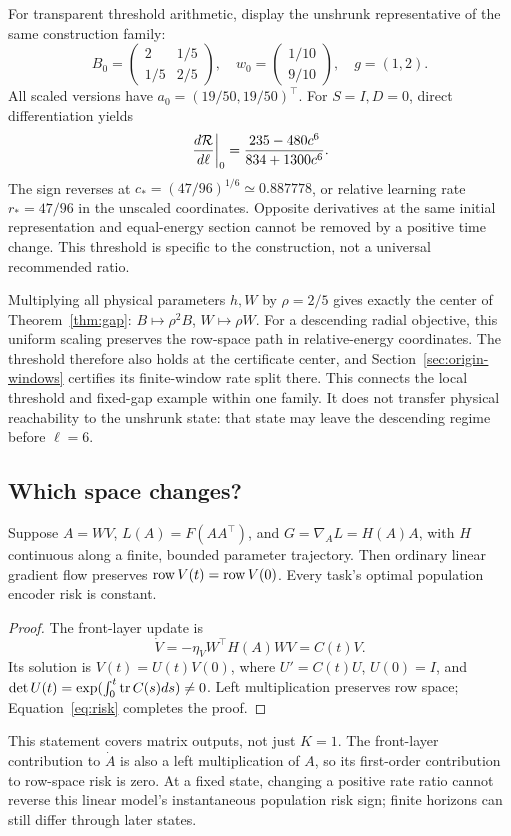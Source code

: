 For transparent threshold arithmetic, display the unshrunk representative of the same construction family:
\begin{equation}
B_0=\begin{pmatrix}2&1/5\\1/5&2/5\end{pmatrix},\quad
w_0=\begin{pmatrix}1/10\\9/10\end{pmatrix},\quad g=(1,2).
\end{equation}
All scaled versions have $a_0=(19/50,19/50)^\top$. For $S=I,D=0$, direct differentiation yields
\begin{equation}
\left.\frac{d\mathcal R}{d\ell}\right|_0
=\frac{235-480c^6}{834+1300c^6}.
\label{eq:threshold}
\end{equation}
The sign reverses at $c_*=(47/96)^{1/6}\simeq0.887778$, or relative learning rate $r_*=47/96$ in the unscaled coordinates. Opposite derivatives at the same initial representation and equal-energy section cannot be removed by a positive time change. This threshold is specific to the construction, not a universal recommended ratio.

Multiplying all physical parameters $h,W$ by $\rho=2/5$ gives exactly the center of Theorem~\ref{thm:gap}: $B\mapsto\rho^2B$, $W\mapsto\rho W$. For a descending radial objective, this uniform scaling preserves the row-space path in relative-energy coordinates. The threshold therefore also holds at the certificate center, and Section~\ref{sec:origin-windows} certifies its finite-window rate split there. This connects the local threshold and fixed-gap example within one family. It does not transfer physical reachability to the unshrunk state: that state may leave the descending regime before $\ell=6$.

\subsection{Which space changes?}
\begin{proposition}
\label{prop:linear}
Suppose $A=WV$, $L(A)=F(AA^\top)$, and $G=\nabla_A L=H(A)A$, with $H$ continuous along a finite, bounded parameter trajectory. Then ordinary linear gradient flow preserves $\operatorname{row} V(t)=\operatorname{row} V(0)$. Every task's optimal population encoder risk is constant.
\end{proposition}
\begin{proof}
The front-layer update is
\begin{equation}
\dot V=-\eta_V W^\top H(A)WV=C(t)V.
\end{equation}
Its solution is $V(t)=U(t)V(0)$, where $U'=C(t)U$, $U(0)=I$, and $\det U(t)=\exp(\int_0^t\operatorname{tr} C(s)ds)\ne0$. Left multiplication preserves row space; Equation~\eqref{eq:risk} completes the proof.
\end{proof}
This statement covers matrix outputs, not just $K=1$. The front-layer contribution to $\dot A$ is also a left multiplication of $A$, so its first-order contribution to row-space risk is zero. At a fixed state, changing a positive rate ratio cannot reverse this linear model's instantaneous population risk sign; finite horizons can still differ through later states.

